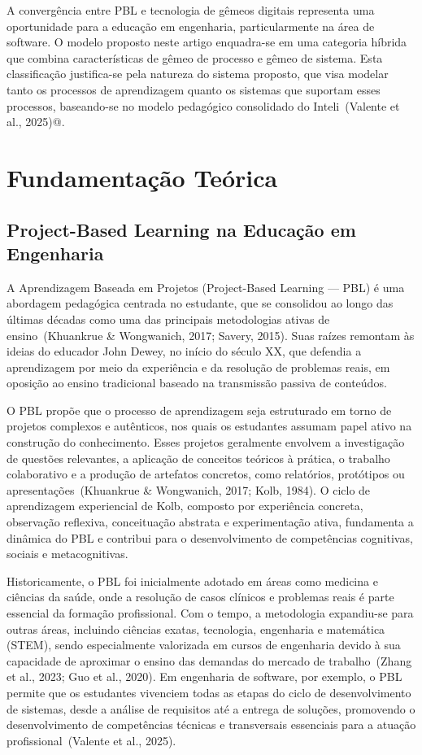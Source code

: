 \documentclass[english, spanish, brazilian]{modelo_dt}
\begin{document}
A convergência entre PBL e tecnologia de gêmeos digitais representa uma
oportunidade para a educação em engenharia, particularmente na área de
software\@. O modelo proposto neste artigo enquadra-se em uma categoria híbrida
que combina características de gêmeo de processo e gêmeo de sistema\@. Esta
classificação justifica-se pela natureza do sistema proposto, que visa modelar
tanto os processos de aprendizagem quanto os sistemas que suportam esses
processos, baseando-se no modelo pedagógico consolidado do Inteli~(Valente et al., 2025)@.

\section{Fundamentação Teórica}

\subsection{Project-Based Learning na Educação em Engenharia}

A Aprendizagem Baseada em Projetos (Project-Based Learning — PBL) é uma
abordagem pedagógica centrada no estudante, que se consolidou ao longo das
últimas décadas como uma das principais metodologias ativas de
ensino~(Khuankrue \& Wongwanich, 2017; Savery, 2015). Suas raízes remontam às
ideias do educador John Dewey, no início do século XX, que defendia a
aprendizagem por meio da experiência e da resolução de problemas reais, em
oposição ao ensino tradicional baseado na transmissão passiva de conteúdos.

O PBL propõe que o processo de aprendizagem seja estruturado em torno de
projetos complexos e autênticos, nos quais os estudantes assumam papel ativo na
construção do conhecimento. Esses projetos geralmente envolvem a investigação
de questões relevantes, a aplicação de conceitos teóricos à prática, o trabalho
colaborativo e a produção de artefatos concretos, como relatórios, protótipos
ou apresentações~(Khuankrue \& Wongwanich, 2017; Kolb, 1984). O ciclo de
aprendizagem experiencial de Kolb, composto por experiência concreta,
observação reflexiva, conceituação abstrata e experimentação ativa, fundamenta
a dinâmica do PBL e contribui para o desenvolvimento de competências
cognitivas, sociais e metacognitivas.

Historicamente, o PBL foi inicialmente adotado em áreas como medicina e
ciências da saúde, onde a resolução de casos clínicos e problemas reais é parte
essencial da formação profissional. Com o tempo, a metodologia expandiu-se para
outras áreas, incluindo ciências exatas, tecnologia, engenharia e matemática
(STEM), sendo especialmente valorizada em cursos de engenharia devido à sua
capacidade de aproximar o ensino das demandas do mercado de trabalho~(Zhang et
al., 2023; Guo et al., 2020). Em engenharia de software, por exemplo, o PBL
permite que os estudantes vivenciem todas as etapas do ciclo de desenvolvimento
de sistemas, desde a análise de requisitos até a entrega de soluções,
promovendo o desenvolvimento de competências técnicas e transversais essenciais
para a atuação profissional~(Valente et al., 2025).
\end{document}
